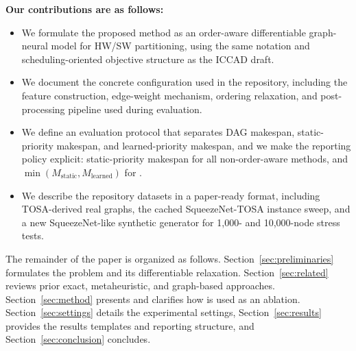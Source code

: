 \noindent\textbf{Our contributions are as follows:}
\begin{itemize}
\item We formulate the proposed method as an order-aware differentiable graph-neural model for HW/SW partitioning, using the same notation and scheduling-oriented objective structure as the ICCAD draft.
\item We document the concrete \diffgnnorder configuration used in the repository, including the feature construction, edge-weight mechanism, ordering relaxation, and post-processing pipeline used during evaluation.
\item We define an evaluation protocol that separates DAG makespan, static-priority makespan, and learned-priority makespan, and we make the reporting policy explicit: static-priority makespan for all non-order-aware methods, and $\min(M_{\mathrm{static}}, M_{\mathrm{learned}})$ for \diffgnnorder.
\item We describe the repository datasets in a paper-ready format, including TOSA-derived real graphs, the cached SqueezeNet-TOSA instance sweep, and a new SqueezeNet-like synthetic generator for 1,000- and 10,000-node stress tests.
\end{itemize}

The remainder of the paper is organized as follows. Section~\ref{sec:preliminaries} formulates the problem and its differentiable relaxation. Section~\ref{sec:related} reviews prior exact, metaheuristic, and graph-based approaches. Section~\ref{sec:method} presents \diffgnnorder and clarifies how \diffgnn is used as an ablation. Section~\ref{sec:settings} details the experimental settings, Section~\ref{sec:results} provides the results templates and reporting structure, and Section~\ref{sec:conclusion} concludes.
